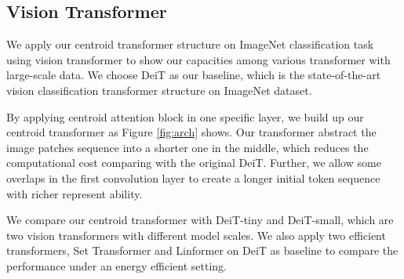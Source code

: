 \documentclass[english]{article}
\begin{document}
\subsection{Vision Transformer}
We apply our centroid transformer structure on ImageNet  \citep{deng2009imagenet} classification task using vision transformer to show our capacities among various transformer with large-scale data. We choose DeiT \citep{touvron2020DeiT} as our baseline, which is the state-of-the-art vision classification transformer structure on ImageNet dataset.

By applying centroid attention block in one specific layer, we build up our centroid transformer as Figure \ref{fig:arch} shows. Our transformer abstract the image patches sequence into a shorter one in the middle, which reduces the computational cost comparing with the original DeiT. Further, we allow some overlaps in the first convolution layer to create a longer initial token sequence with richer represent ability.

We compare our centroid transformer with DeiT-tiny and DeiT-small, which are two vision transformers with different model scales. We also apply two efficient transformers, Set Transformer \citep{lee2019set} and Linformer \citep{wang2020linformer} on DeiT as baseline to compare the performance under an energy efficient setting.

\begin{table}[ht]
    \centering
    \caption{Architecture design of different models for image classification tasks on ImageNet, centroid @ means replacing the self-attention block with the centroid attention block at specific layer.}
    \label{tab:arch}
\end{table}
\end{document}
